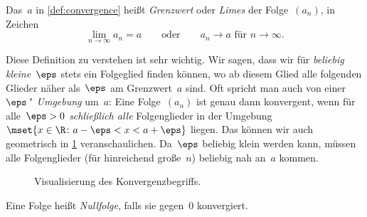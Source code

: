 \documentclass[a4paper]{article}
\begin{document}
\begin{definition}
    Das~$a$ in \cref{def:convergence} heißt \emph{Grenzwert} oder \emph{Limes} der Folge~$(a_n)$, in Zeichen
    \begin{equation*}
        \lim_{n\to\infty} a_n = a \qquad\text{oder}\qquad a_n \to a \text{ für } n \to \infty.
    \end{equation*}
\end{definition}

Diese Definition zu verstehen ist sehr wichtig. Wir sagen, dass wir für \emph{beliebig kleine}~$\eps$ stets ein Folgeglied finden können, wo ab diesem Glied alle folgenden Glieder näher als~$\eps$ am Grenzwert~$a$ sind. Oft spricht man auch von einer \emph{$\eps$"~Umgebung} um~$a$: Eine Folge~$(a_n)$ ist genau dann konvergent, wenn für alle~$\eps > 0$ \emph{schließlich alle} Folgenglieder in der Umgebung $\mset{x \in \R\colon a-\eps < x < a+\eps}$ liegen. Das können wir auch geometrisch in \cref{fig:convergence} veranschaulichen. Da~$\eps$ beliebig klein werden kann, müssen alle Folgenglieder (für hinreichend große~$n$) beliebig nah an~$a$ kommen.

\begin{figure}
    \caption{Visualisierung des Konvergenzbegriffs.}\label{fig:convergence}
\end{figure}

\begin{definition}[Nullfolge]
    Eine Folge heißt \emph{Nullfolge}, falls sie gegen~0 konvergiert.
\end{definition}
\end{document}

